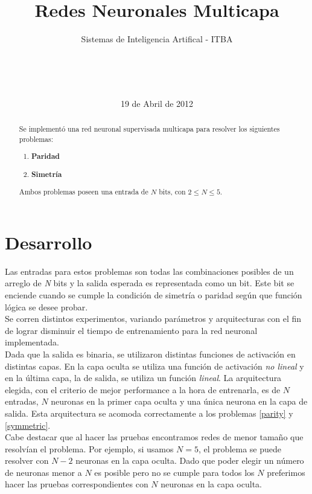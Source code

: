 \documentclass{sig-alternate}
\begin{document}
\title{Redes Neuronales Multicapa}
\subtitle{Sistemas de Inteligencia Artifical - ITBA}


\author{
	\\
	\\
	\\	
}

\date{19 de Abril de 2012}

\maketitle

\begin{abstract}
	Se implement\'o una red neuronal supervisada multicapa para resolver los siguientes problemas:
	\begin{enumerate}
 		\item \textbf{Paridad} \label{parity}
		\item \textbf{Simetr\'ia}	\label{symmetric}
	\end{enumerate}
	Ambos problemas poseen una entrada de $N$ bits, con $2 \leq N \leq 5$.
\end{abstract}

\section*{Desarrollo}
	Las entradas para estos problemas son todas las combinaciones posibles de un arreglo de \textit{N} bits y la salida esperada es representada como un bit. Este bit se enciende cuando se cumple la condici\'on de simetr\'ia o paridad seg\'un que funci\'on l\'ogica se desee probar. \\
	Se corren distintos experimentos, variando par\'ametros y arquitecturas con el fin de lograr disminuir el tiempo de entrenamiento para la red neuronal implementada. \\
	Dada que la salida es binaria, se utilizaron distintas funciones de activaci\'on en distintas capas. En la capa oculta se utiliza una funci\'on de activaci\'on \textit{no lineal} y en la \'ultima capa, la de salida, se utiliza un funci\'on \textit{lineal}. La arquitectura elegida, con el criterio de mejor performance a la hora de entrenarla, es de $N$ entradas, $N$ neuronas en la primer capa oculta y una \'unica neurona en la capa de salida. Esta arquitectura se acomoda correctamente a los problemas \ref{parity} y \ref{symmetric}. \\
	Cabe destacar que al hacer las pruebas encontramos redes de menor
	tama\~no que resolv\'ian el problema.
	Por ejemplo, si usamos $N = 5$, el problema se puede resolver con
	$N-2$ neuronas en la capa oculta. Dado que poder elegir un n\'umero
	de neuronas menor a $N$ es posible pero no se cumple para todos
	los $N$ preferimos hacer las pruebas correspondientes con $N$ neuronas
	en la capa oculta.
\end{document}
